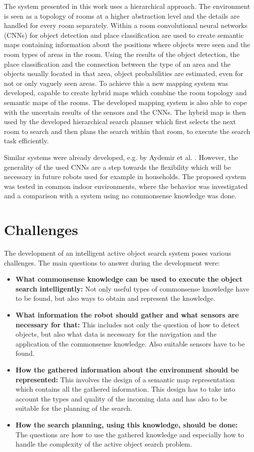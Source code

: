 The system presented in this work uses a hierarchical approach. The environment is seen as a topology of rooms at a higher abstraction level and the details are handled for every room separately. Within a room convolutional neural networks (CNNs) for object detection and place classification are used to create semantic maps containing information about the positions where objects were seen and the room types of areas in the room. Using the results of the object detection, the place classification and the connection between the type of an area and the objects usually located in that area, object probabilities are estimated, even for not or only vaguely seen areas. To achieve this a new mapping system was developed, capable to create hybrid maps which combine the room topology and semantic maps of the rooms. The developed mapping system is also able to cope with the uncertain results of the sensors and the CNNs. The hybrid map is then used by the developed hierarchical search planner which first selects the next room to search and then plans the search within that room, to execute the search task efficiently. 

Similar systems were already developed, e.g. by Aydemir et al. \cite{main}. However, the generality of the used CNNs are a step towards the flexibility which will be necessary in future robots used for example in households. The proposed system was tested in common indoor environments, where the behavior was investigated and a comparison with a system using no commonsense knowledge was done.

\section{Challenges}

The development of an intelligent active object search system poses various challenges. The main questions to answer during the development were:
\begin{itemize}
 \item \textbf{What commonsense knowledge can be used to execute the object search intelligently:} Not only useful types of commonsense knowledge have to be found, but also ways to obtain and represent the knowledge.
 \item \textbf{What information the robot should gather and what sensors are necessary for that:} This includes not only the question of how to detect objects, but also what data is necessary for the navigation and the application of the commonsense knowledge. Also suitable sensors have to be found.
 \item \textbf{How the gathered information about the environment should be represented:} This involves the design of a semantic map representation which contains all the gathered information. This design has to take into account the types and quality of the incoming data and has also to be suitable for the planning of the search.
 \item \textbf{How the search planning, using this knowledge, should be done:} The questions are how to use the gathered knowledge and especially how to handle the complexity of the active object search problem.
\end{itemize}

